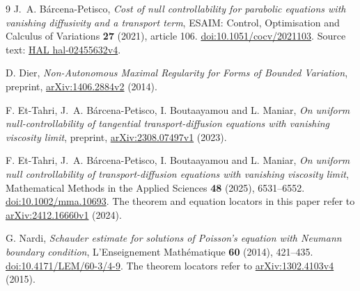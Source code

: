 \documentclass[11pt]{article}
\theoremstyle{remark}
\begin{document}
\begin{thebibliography}{9}
J.~A. B\'arcena-Petisco,
\emph{Cost of null controllability for parabolic equations with vanishing
diffusivity and a transport term}, ESAIM: Control, Optimisation and Calculus
of Variations \textbf{27} (2021), article 106.
\href{https://doi.org/10.1051/cocv/2021103}{doi:10.1051/cocv/2021103}.
Source text: \href{https://hal.science/hal-02455632v4}{HAL hal-02455632v4}.

D. Dier, \emph{Non-Autonomous Maximal Regularity for Forms of Bounded
Variation}, preprint, \href{https://arxiv.org/abs/1406.2884v2}{arXiv:1406.2884v2}
(2014).

F. Et-Tahri, J.~A. B\'arcena-Petisco, I. Boutaayamou and L. Maniar,
\emph{On uniform null-controllability of tangential transport-diffusion
equations with vanishing viscosity limit}, preprint,
\href{https://arxiv.org/abs/2308.07497v1}{arXiv:2308.07497v1} (2023).

F. Et-Tahri, J.~A. B\'arcena-Petisco, I. Boutaayamou and L. Maniar,
\emph{On uniform null controllability of transport-diffusion equations with
vanishing viscosity limit}, Mathematical Methods in the Applied Sciences
\textbf{48} (2025), 6531--6552.
\href{https://doi.org/10.1002/mma.10693}{doi:10.1002/mma.10693}.
The theorem and equation locators in this paper refer to
\href{https://arxiv.org/abs/2412.16660v1}{arXiv:2412.16660v1} (2024).

G. Nardi, \emph{Schauder estimate for solutions of Poisson's equation with
Neumann boundary condition}, L'Enseignement Math\'ematique \textbf{60} (2014),
421--435. \href{https://doi.org/10.4171/LEM/60-3/4-9}{doi:10.4171/LEM/60-3/4-9}.
The theorem locators refer to
\href{https://arxiv.org/abs/1302.4103v4}{arXiv:1302.4103v4} (2015).
\end{thebibliography}
\end{document}
